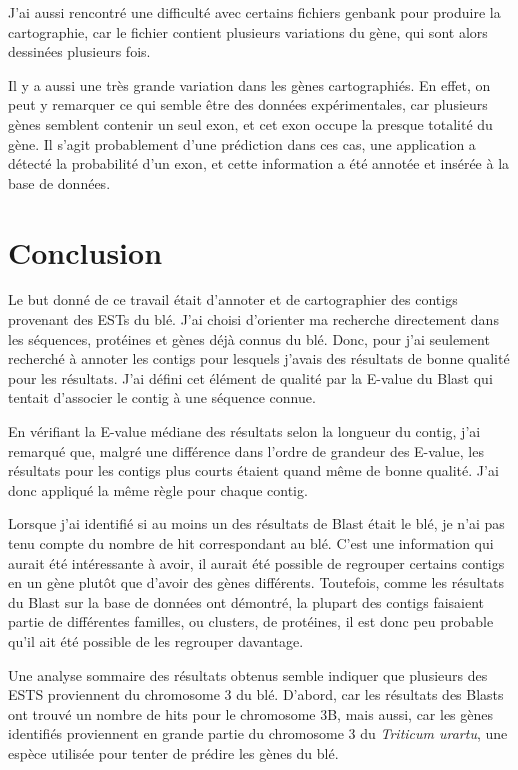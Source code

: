 \documentclass[10.9pt]{article} %
\begin{document}
J'ai aussi rencontré une difficulté avec certains fichiers genbank pour produire la cartographie, car le fichier contient plusieurs
variations du gène, qui sont alors dessinées plusieurs fois.

Il y a aussi une très grande variation dans les gènes cartographiés. En effet, on peut y remarquer ce qui semble être des données
expérimentales, car plusieurs gènes semblent contenir un seul exon, et cet exon occupe la presque totalité du gène. Il s'agit probablement
d'une prédiction dans ces cas, une application a détecté la probabilité d'un exon, et cette information a été annotée et insérée
à la base de données.



\section{Conclusion}

Le but donné de ce travail était d'annoter et de cartographier des contigs provenant des ESTs du blé. J'ai choisi d'orienter
ma recherche directement dans les séquences, protéines et gènes déjà connus du blé. Donc, pour j'ai seulement recherché à annoter
les contigs pour lesquels j'avais des résultats de bonne qualité pour les résultats. J'ai défini cet élément de qualité par la
E-value du Blast qui tentait d'associer le contig à une séquence connue. 

En vérifiant la E-value médiane des résultats selon la longueur du contig, j'ai remarqué que, malgré une différence dans l'ordre
de grandeur des E-value, les résultats pour les contigs plus courts étaient quand même de bonne qualité. J'ai donc appliqué la même
règle pour chaque contig.

Lorsque j'ai identifié si au moins un des résultats de Blast était le blé, je n'ai pas tenu compte du nombre de hit correspondant
au blé. C'est une information qui aurait été intéressante à avoir, il aurait été possible de regrouper certains contigs
en un gène plutôt que d'avoir des gènes différents. Toutefois, comme les résultats du Blast sur la base de données ont démontré, 
la plupart des contigs faisaient partie de différentes familles, ou clusters, de protéines, il est donc peu probable qu'il ait été
possible de les regrouper davantage.

Une analyse sommaire des résultats obtenus semble indiquer que plusieurs des ESTS proviennent du chromosome 3 du blé. D'abord, car
les résultats des Blasts ont trouvé un nombre de hits pour le chromosome 3B, mais aussi, car les gènes identifiés proviennent en grande
partie du chromosome 3 du \emph{Triticum urartu}, une espèce utilisée pour tenter de prédire les gènes du blé.
\end{document}
